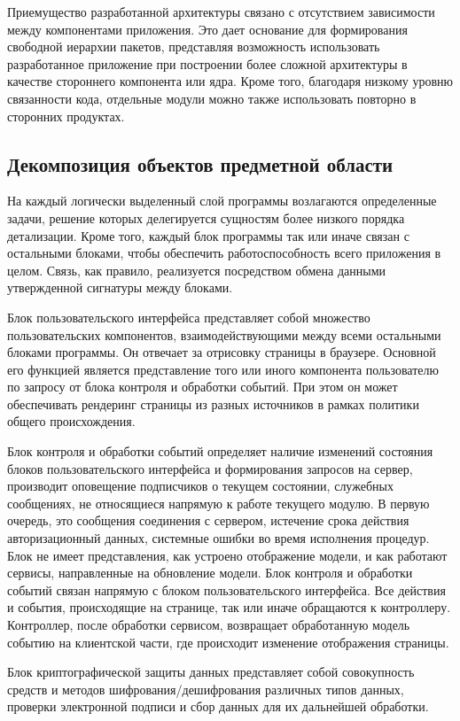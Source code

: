 Приемущество разработанной архитектуры связано с отсутствием зависимости между компонентами приложения. Это дает основание для формирования свободной иерархии пакетов, представляя возможность использовать разработанное приложение при построении более сложной архитектуры в качестве стороннего компонента или ядра. Кроме того, благодаря низкому уровню связанности кода, отдельные модули можно также использовать повторно в сторонних продуктах.

\subsection{Декомпозиция объектов предметной области}
\label{sub:domain:object_decomp}

На каждый логически выделенный слой программы возлагаются определенные задачи, решение которых делегируется сущностям более низкого порядка детализации. Кроме того, каждый блок программы так или иначе связан с остальными блоками, чтобы обеспечить работоспособность всего приложения в целом. Связь, как правило, реализуется посредством обмена данными утвержденной сигнатуры между блоками.

Блок пользовательского интерфейса представляет собой множество пользовательских компонентов, взаимодействующими между всеми остальными блоками программы. Он отвечает за отрисовку страницы в браузере. Основной его функцией является представление того или иного компонента пользователю по запросу от блока контроля и обработки событий. При этом он может обеспечивать рендеринг страницы из разных источников в рамках политики общего происхождения.

Блок контроля и обработки событий определяет наличие изменений состояния блоков пользовательского интерфейса и формирования запросов на сервер, производит оповещение подписчиков о текущем состоянии, служебных сообщениях, не относящиеся напрямую к работе текущего модулю. В первую очередь, это сообщения соединения с сервером, истечение срока действия авторизационный данных, системные ошибки во время исполнения процедур. Блок не имеет представления, как устроено отображение модели, и как работают сервисы, направленные на обновление модели. Блок контроля и обработки событий связан напрямую с блоком пользовательского интерфейса. Все действия и события, происходящие на странице, так или иначе обращаются к контроллеру. Контроллер, после обработки сервисом, возвращает обработанную модель событию на клиентской части, где происходит изменение отображения страницы.

Блок криптографической защиты данных представляет собой совокупность средств и методов шифрования/дешифрования различных типов данных, проверки электронной подписи и сбор данных для их дальнейшей обработки.


